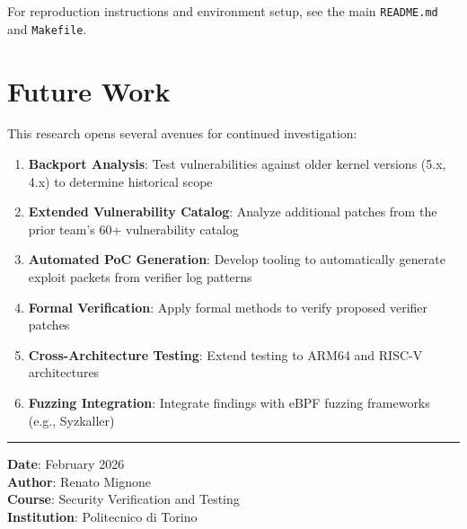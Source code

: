 For reproduction instructions and environment setup, see the main \texttt{README.md} and \texttt{Makefile}.

\section{Future Work}

\noindent
This research opens several avenues for continued investigation:

\begin{enumerate}[label=\arabic*.]
  \item \textbf{Backport Analysis}: Test vulnerabilities against older kernel versions (5.x, 4.x) to determine historical scope
  \item \textbf{Extended Vulnerability Catalog}: Analyze additional patches from the prior team's 60+ vulnerability catalog
  \item \textbf{Automated PoC Generation}: Develop tooling to automatically generate exploit packets from verifier log patterns
  \item \textbf{Formal Verification}: Apply formal methods to verify proposed verifier patches~\cite{nelson2020bpf,vishwanathan2023bpf}
  \item \textbf{Cross-Architecture Testing}: Extend testing to ARM64 and RISC-V architectures
  \item \textbf{Fuzzing Integration}: Integrate findings with eBPF fuzzing frameworks (e.g., Syzkaller)
\end{enumerate}

\vspace{1cm}
\noindent
\rule{\textwidth}{0.4pt}

\vspace{0.3cm}
\noindent
\textbf{Date}: February 2026\\
\textbf{Author}: Renato Mignone\\
\textbf{Course}: Security Verification and Testing\\
\textbf{Institution}: Politecnico di Torino
